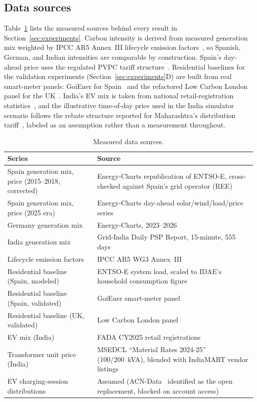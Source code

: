 \documentclass[journal]{IEEEtran}
\begin{document}
\subsection{Data sources}
\label{sec:data}
Table~\ref{tab:data} lists the measured sources behind every result in Section~\ref{sec:experiments}. Carbon intensity is derived from measured generation mix weighted by IPCC AR5 Annex~III lifecycle emission factors~\cite{ipcc2014ar5}, so Spanish, German, and Indian intensities are comparable by construction. Spain's day-ahead price uses the regulated PVPC tariff structure~\cite{ree_pvpc}. Residential baselines for the validation experiments (Section~\ref{sec:experiments}D) are built from real smart-meter panels: GoiEner for Spain~\cite{quesada2024goiener} and the refactored Low Carbon London panel for the UK~\cite{tindemans2023lcl}. India's EV mix is taken from national retail-registration statistics~\cite{fada2025}, and the illustrative time-of-day price used in the India simulator scenario follows the rebate structure reported for Maharashtra's distribution tariff~\cite{ceew2025tariff,merc2025}, labeled as an assumption rather than a measurement throughout.

\begin{table}[t]
\centering
\caption{Measured data sources.}
\label{tab:data}
\begin{tabular}{p{1.7cm}p{6.1cm}}
\toprule
\textbf{Series} & \textbf{Source} \\
\midrule
Spain generation mix, price (2015--2018, corrected) & Energy-Charts republication of ENTSO-E, cross-checked against Spain's grid operator (REE) \\
Spain generation mix, price (2025 era) & Energy-Charts day-ahead solar/wind/load/price series \\
Germany generation mix & Energy-Charts, 2023--2026 \\
India generation mix & Grid-India Daily PSP Report, 15-minute, 555 days \\
Lifecycle emission factors & IPCC AR5 WG3 Annex~III~\cite{ipcc2014ar5} \\
Residential baseline (Spain, modeled) & ENTSO-E system load, scaled to IDAE's household consumption figure \\
Residential baseline (Spain, validated) & GoiEner smart-meter panel~\cite{quesada2024goiener} \\
Residential baseline (UK, validated) & Low Carbon London panel~\cite{tindemans2023lcl} \\
EV mix (India) & FADA CY2025 retail registrations~\cite{fada2025} \\
Transformer unit price (India) & MSEDCL ``Material Rates 2024-25''~\cite{msedcl2024} (100/200~kVA), blended with IndiaMART vendor listings \\
EV charging-session distributions & Assumed (ACN-Data~\cite{leeacndata} identified as the open replacement, blocked on account access) \\
\bottomrule
\end{tabular}
\end{table}
\end{document}
